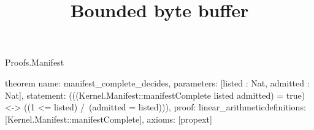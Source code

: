 \begin{lexlean}{Proofs.Manifest}
\title{Bounded byte buffer}
\begin{semanticmodule}
theorem{
  name: manifest_complete_decides,
  parameters: [listed : Nat, admitted : Nat],
  statement: (((Kernel.Manifest::manifestComplete listed admitted) = true) <-> ((1 <= listed) /\ (admitted = listed))),
  proof: linear_arithmetic{definitions: [Kernel.Manifest::manifestComplete]},
  axioms: [propext]
}
\end{semanticmodule}
\end{lexlean}
